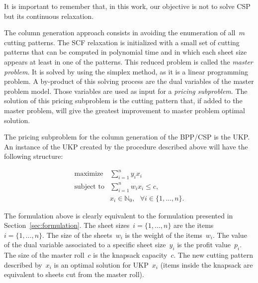 It is important to remember that, in this work, our objective is not to solve CSP but its continuous relaxation.

The column generation approach consists in avoiding the enumeration of all~\(m\) cutting patterns.
The SCF relaxation is initialized with a small set of cutting patterns that can be computed in polynomial time and in which each sheet size appears at least in one of the patterns.
This reduced problem is called the \emph{master problem}.
It is solved by using the simplex method, as it is a linear programming problem.
A by-product of this solving process are the dual variables of the master problem model.
Those variables are used as input for a \emph{pricing subproblem}.
The solution of this pricing subproblem is the cutting pattern that, if added to the master problem, will give the greatest improvement to master problem optimal solution.

The pricing subproblem for the column generation of the BPP/CSP is the UKP.
An instance of the UKP created by the procedure described above will have the following structure:

\begin{align}
  \mbox{maximize} & \sum_{i=1}^n y_i x_i \label{eq:csp_ukp_objfun}\\
\mbox{subject~to} & \sum_{i=1}^n w_i x_i \leq c,\label{eq:csp_ukp_cap}\\
           & x_i \in \mathbb{N}_0,~~~\forall i \in \{1,...,n\}.\label{eq:csp_ukp_x_integer}
\end{align}

The formulation above is clearly equivalent to the formulation presented in Section~\ref{sec:formulation}.
The sheet sizes~\(i = \{1, \dots, n\}\) are the items~\(i = \{1, \dots, n\}\).
The size of the sheets~\(w_i\) is the weight of the items~\(w_i\).
The value of the dual variable associated to a specific sheet size~\(y_i\) is the profit value~\(p_i\).
The size of the master roll~\(c\) is the knapsack capacity~\(c\).
The new cutting pattern described by~\(x_i\) is an optimal solution for UKP~\(x_i\) (items inside the knapsack are equivalent to sheets cut from the master roll).


